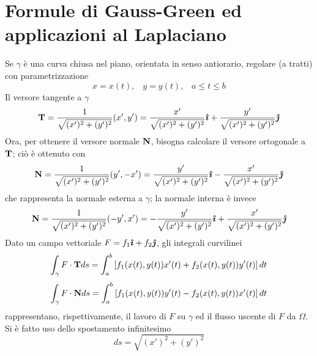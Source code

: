 \section{Formule di Gauss-Green ed applicazioni al Laplaciano}
Se $\gamma$ \`e una curva chiusa nel piano, orientata in senso antiorario,
regolare (a tratti) con parametrizzazione
\[
	x= x(t), \;\;\; y=y(t), \;\;\; a\leq t \leq b
\]
Il versore tangente a $\gamma$
\[
	{\bf T}= \frac{1}{\sqrt{(x')^2+ (y')^2}}(x', y')
	=\frac{x'}{\sqrt{(x')^2+ (y')^2}}\boldsymbol{\hat{\imath}}
	+\frac{y'}{\sqrt{(x')^2+ (y')^2}}\boldsymbol{\hat{\jmath}}
\]
Ora, per ottenere il versore normale ${\bf N}$, bisogna calcolare il versore
ortogonale a ${\bf T}$; ci\`o \`e ottenuto con
\[
	{\bf N}= \frac{1}{\sqrt{(x')^2+ (y')^2}}(y', -x')
	=\frac{y'}{\sqrt{(x')^2+ (y')^2}}\boldsymbol{\hat{\imath}}
	-\frac{x'}{\sqrt{(x')^2+ (y')^2}}\boldsymbol{\hat{\jmath}}
\]
che rappresenta la normale esterna a $\gamma$; la normale interna \`e invece
\[
	{\bf N}= \frac{1}{\sqrt{(x')^2+ (y')^2}}(-y', x')
	=-\frac{y'}{\sqrt{(x')^2+ (y')^2}}\boldsymbol{\hat{\imath}}
	+\frac{x'}{\sqrt{(x')^2+ (y')^2}}\boldsymbol{\hat{\jmath}}
\]
Dato un campo vettoriale $F= f_1 \boldsymbol{\hat{\imath}} + f_2 \boldsymbol{\hat{\jmath}}$, gli integrali curvilinei
\[
	\int_ {\gamma} F \cdot {\bf T} ds= 
	\int_a^b \left[ f_1 (x(t), y(t))x'(t)+
	f_2 (x(t), y(t))y'(t)
	\right] dt
\]
\[
	\int_ {\gamma} F \cdot {\bf N} ds= 
	\int_a^b \left[ f_1 (x(t), y(t))y'(t)
	- f_2 (x(t), y(t))x'(t)
	\right] dt
\]
rappresentano, rispettivamente, il lavoro di $F$ su $\gamma$ ed il flusso
uscente di $F$ da $\Omega$. Si \`e fatto uso dello spostamento infinitesimo
\[
	ds= \sqrt{(x')^2+(y')^2}
\]

